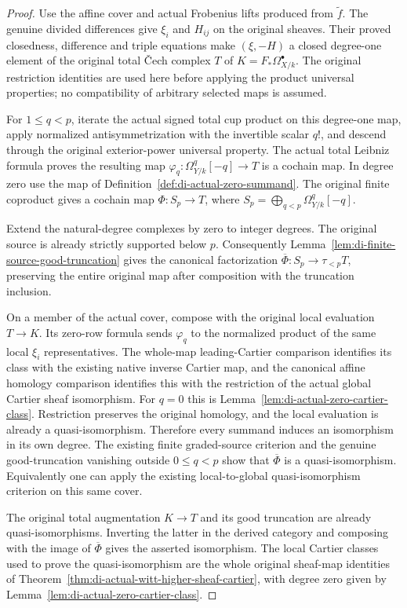 \begin{proof}
\leanok
Use the affine cover and actual Frobenius lifts produced from
$\widetilde f$. The genuine divided differences give $\xi_i$ and
$H_{ij}$ on the original sheaves. Their proved closedness, difference
and triple equations make $(\xi,-H)$ a closed degree-one element of the
original total \v Cech complex $T$ of $K=F_*\Omega^\bullet_{X/k}$.
The original restriction identities are used here before applying the
product universal properties; no compatibility of arbitrary selected
maps is assumed.

For $1\le q<p$, iterate the actual signed total cup product on this
degree-one map, apply normalized antisymmetrization with the invertible
scalar $q!$, and descend through the original exterior-power universal
property. The actual total Leibniz formula proves the resulting map
$\varphi_q:\Omega^q_{Y/k}[-q]\to T$ is a cochain map. In degree zero
use the map of Definition~\ref{def:di-actual-zero-summand}. The original
finite coproduct gives a cochain map $\Phi:S_p\to T$, where
$S_p=\bigoplus_{q<p}\Omega^q_{Y/k}[-q]$.

Extend the natural-degree complexes by zero to integer degrees. The
original source is already strictly supported below $p$. Consequently
Lemma~\ref{lem:di-finite-source-good-truncation} gives the canonical
factorization $\overline\Phi:S_p\to\tau_{<p}T$, preserving the entire
original map after composition with the truncation inclusion.

On a member of the actual cover, compose with the original local
evaluation $T\to K$. Its zero-row formula sends $\varphi_q$ to the
normalized product of the same local $\xi_i$ representatives. The
whole-map leading-Cartier comparison identifies its class with the
existing native inverse Cartier map, and the canonical affine homology
comparison identifies this with the restriction of the actual global
Cartier sheaf isomorphism. For $q=0$ this is
Lemma~\ref{lem:di-actual-zero-cartier-class}. Restriction preserves the
original homology, and the local evaluation is already a
quasi-isomorphism. Therefore every summand induces an isomorphism in its
own degree. The existing finite graded-source criterion and the genuine
good-truncation vanishing outside $0\le q<p$ show that
$\overline\Phi$ is a quasi-isomorphism. Equivalently one can apply the
existing local-to-global quasi-isomorphism criterion on this same cover.

The original total augmentation $K\to T$ and its good truncation are
already quasi-isomorphisms. Inverting the latter in the derived category
and composing with the image of $\overline\Phi$ gives the asserted
isomorphism. The local Cartier classes used to prove the
quasi-isomorphism are the whole original sheaf-map identities of
Theorem~\ref{thm:di-actual-witt-higher-sheaf-cartier}, with degree zero
given by Lemma~\ref{lem:di-actual-zero-cartier-class}.
\end{proof}

